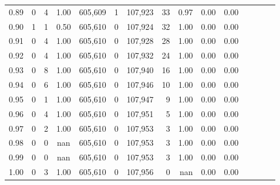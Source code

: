 \begin{tabular}{rrrcrrrrrrrrrrr}
0.89 &       0 &      4 &                                       1.00 &  605,609 &        1 &  107,923 &       33 &  0.97 &  0.00 &                         0.00 \\
0.90 &       1 &      1 &                                       0.50 &  605,610 &        0 &  107,924 &       32 &  1.00 &  0.00 &                         0.00 \\
0.91 &       0 &      4 &                                       1.00 &  605,610 &        0 &  107,928 &       28 &  1.00 &  0.00 &                         0.00 \\
0.92 &       0 &      4 &                                       1.00 &  605,610 &        0 &  107,932 &       24 &  1.00 &  0.00 &                         0.00 \\
0.93 &       0 &      8 &                                       1.00 &  605,610 &        0 &  107,940 &       16 &  1.00 &  0.00 &                         0.00 \\
0.94 &       0 &      6 &                                       1.00 &  605,610 &        0 &  107,946 &       10 &  1.00 &  0.00 &                         0.00 \\
0.95 &       0 &      1 &                                       1.00 &  605,610 &        0 &  107,947 &        9 &  1.00 &  0.00 &                         0.00 \\
0.96 &       0 &      4 &                                       1.00 &  605,610 &        0 &  107,951 &        5 &  1.00 &  0.00 &                         0.00 \\
0.97 &       0 &      2 &                                       1.00 &  605,610 &        0 &  107,953 &        3 &  1.00 &  0.00 &                         0.00 \\
0.98 &       0 &      0 &                                        nan &  605,610 &        0 &  107,953 &        3 &  1.00 &  0.00 &                         0.00 \\
0.99 &       0 &      0 &                                        nan &  605,610 &        0 &  107,953 &        3 &  1.00 &  0.00 &                         0.00 \\
1.00 &       0 &      3 &                                       1.00 &  605,610 &        0 &  107,956 &        0 &   nan &  0.00 &                         0.00 \\
\bottomrule
\end{tabular}
